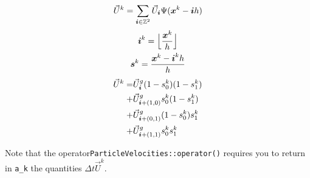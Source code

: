 \documentclass[11pt]{article}
\begin{document}
\begin{enumerate}
          \begin{gather*}
              \vec{U}^k = \sum \limits_{{\boldsymbol{i}} \in \mathbb{Z}^2} \vec{U}_{\boldsymbol{i}} \Psi({\boldsymbol{x}}^k - {\boldsymbol{i}} h)
          \end{gather*}
          \begin{gather*}
              {\boldsymbol{i}}^k = \Big \lfloor \frac{{\boldsymbol{x}}^k}{h} \Big \rfloor \\
              {\boldsymbol{s}}^k =\frac{{\boldsymbol{x}}^k - {\boldsymbol{i}}^k h}{h}
          \end{gather*}
          \begin{align*}
              \vec{U}^k = & \vec{U}^g_{\boldsymbol{i}} (1 - s^k_0)(1-s^k_1)        \\
              +           & \vec{U}^g_{{\boldsymbol{i}} + (1,0)} s^k_0 (1 - s^k_1) \\
              +           & \vec{U}^g_{{\boldsymbol{i}} + (0,1)}(1 - s^k_0) s^k_1  \\
              +           & \vec{U}^g_{{\boldsymbol{i}} + (1,1)} s^k_0 s^k_1
          \end{align*}
\end{enumerate}
Note that the operator{\tt ParticleVelocities::operator()} requires you to return in {\tt a\_k} the quantities $\Delta t  \vec{U}^k$.
\end{document}
